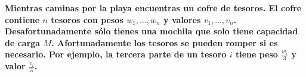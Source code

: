 \textbf{Mientras caminas por la playa encuentras un cofre de tesoros. El cofre contiene $n$ tesoros con pesos $w_1, \dots, w_n$ y valores $v_1, \dots, v_n$. Desafortunadamente sólo tienes una mochila que solo tiene capacidad de carga $M$. Afortunadamente los tesoros se pueden romper si es necesario. Por ejemplo, la tercera parte de un tesoro $i$ tiene peso $\frac{w_i}{3}$ y valor $\frac{v_i}{3}$.}\vspace{.2cm}